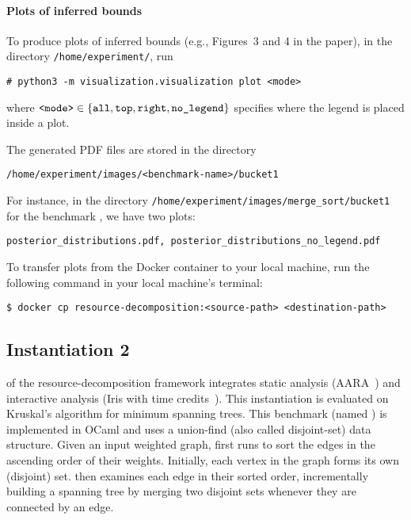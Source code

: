 \paragraph{Plots of inferred bounds}

To produce plots of inferred bounds (e.g., Figures~3 and 4 in the paper), in the
directory \texttt{/home/experiment/}, run
\begin{verbatim}
# python3 -m visualization.visualization plot <mode>
\end{verbatim}
where $\texttt{<mode>} \in \{ {\texttt{all}, \texttt{top}, \texttt{right},
    \texttt{no\_legend}} \}$ specifies where the legend is placed inside a plot.

The generated PDF files are stored in the directory
\begin{verbatim}
/home/experiment/images/<benchmark-name>/bucket1
\end{verbatim}
%
For instance, in the directory \texttt{/home/experiment/images/merge\_sort/bucket1}
for the benchmark \mergesort{}, we have two plots:
\begin{verbatim}
posterior_distributions.pdf, posterior_distributions_no_legend.pdf
\end{verbatim}

To transfer plots from the Docker container to your local machine, run the
following command in your local machine's terminal:
\begin{verbatim}
$ docker cp resource-decomposition:<source-path> <destination-path>
\end{verbatim}

\subsection{Instantiation 2}
\label{sec:step-by-step-instructions:instantiation-2}

 of the resource-decomposition framework
integrates static analysis (AARA~\citep{Hoffmann2011a,Hoffmann2017}) and
interactive analysis (Iris with time credits~\citep{Chargueraud2019}).
%
This instantiation is evaluated on Kruskal's algorithm for minimum spanning
trees.
%
This benchmark (named \kruskal{}) is implemented in OCaml and uses a union-find
(also called disjoint-set) data structure.
%
Given an input weighted graph, \kruskal{} first runs \mergesort{} to sort the
edges in the ascending order of their weights.
%
Initially, each vertex in the graph forms its own (disjoint) set.
%
\kruskal{} then examines each edge in their sorted order, incrementally building
a spanning tree by merging two disjoint sets whenever they are connected by an
edge.

